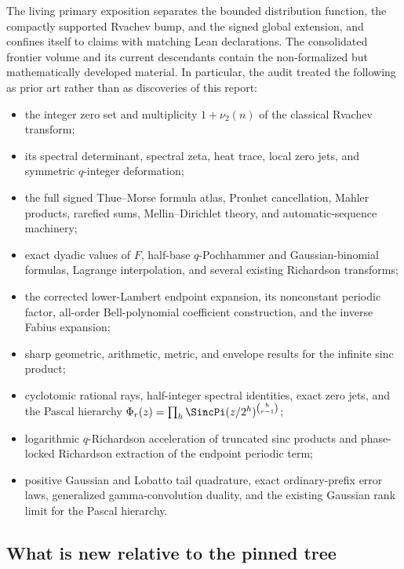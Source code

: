 \documentclass[11pt,oneside]{article}
\numberwithin{equation}{section}
\theoremstyle{definition}
\theoremstyle{remark}
\begin{document}
The living primary exposition separates the bounded distribution function, the compactly
supported Rvachev bump, and the signed global extension, and confines itself to claims with
matching Lean declarations.  The consolidated frontier volume and its current descendants
contain the non-formalized but mathematically developed material.  In particular, the audit
treated the following as prior art rather than as discoveries of this report:
\begin{itemize}
\item the integer zero set and multiplicity $1+\nu_2(n)$ of the classical Rvachev transform;
\item its spectral determinant, spectral zeta, heat trace, local zero jets, and symmetric
      $q$-integer deformation;
\item the full signed Thue--Morse formula atlas, Prouhet cancellation, Mahler products,
      rarefied sums, Mellin--Dirichlet theory, and automatic-sequence machinery;
\item exact dyadic values of $F$, half-base $q$-Pochhammer and Gaussian-binomial formulas,
      Lagrange interpolation, and several existing Richardson transforms;
\item the corrected lower-Lambert endpoint expansion, its nonconstant periodic factor,
      all-order Bell-polynomial coefficient construction, and the inverse Fabius expansion;
\item sharp geometric, arithmetic, metric, and envelope results for the infinite sinc product;
\item cyclotomic rational rays, half-integer spectral identities, exact zero jets, and the
      Pascal hierarchy
      $\Phi_r(z)=\prod_h\SincPi(z/2^h)^{\binom h{r-1}}$;
\item logarithmic $q$-Richardson acceleration of truncated sinc products and phase-locked
      Richardson extraction of the endpoint periodic term;
\item positive Gaussian and Lobatto tail quadrature, exact ordinary-prefix error laws,
      generalized gamma-convolution duality, and the existing Gaussian rank limit for the
      Pascal hierarchy.
\end{itemize}

\subsection{What is new relative to the pinned tree}
\end{document}
